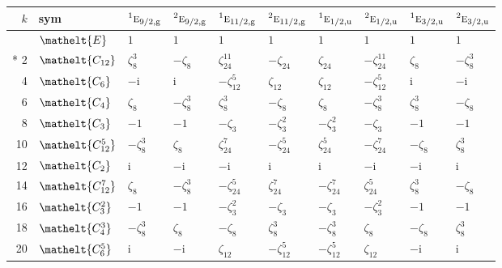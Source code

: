 \documentclass[10pt,a4paper]{article}
\numberwithin{equation}{section}
\newcommand{\eltfont}[1]{{\let\sigma\eltsigma\mathelt{#1}}}
\newcommand{\irr}[1]{\text{\normalfont\scshape #1}}
\newcommand{\conjpair}[1]{{}^{#1}}
\newcommand{\cls}[1]{\eltfont{#1}}
\newcommand{\ptag}[1]{\mathrm{#1}}
\newcommand{\iunit}{\mathrm{i}}
\newcommand{\rootunity}[1]{\zeta_{#1}}
\begin{document}
{\small\setlength{\tabcolsep}{4pt}
\begin{longtable}{@{}rlllllllll@{}}\toprule
$k$ & sym & $\conjpair{1}\irr{e}_{9/2,\ptag{g}}$ & $\conjpair{2}\irr{e}_{9/2,\ptag{g}}$ & $\conjpair{1}\irr{e}_{11/2,\ptag{g}}$ & $\conjpair{2}\irr{e}_{11/2,\ptag{g}}$ & $\conjpair{1}\irr{e}_{1/2,\ptag{u}}$ & $\conjpair{2}\irr{e}_{1/2,\ptag{u}}$ & $\conjpair{1}\irr{e}_{3/2,\ptag{u}}$ & $\conjpair{2}\irr{e}_{3/2,\ptag{u}}$\\\midrule\endhead
\bottomrule\endfoot\endlastfoot
0 & $\cls{E}$ & $1$ & $1$ & $1$ & $1$ & $1$ & $1$ & $1$ & $1$\\*
2 & $\cls{C_{12}}$ & $\rootunity{8}^{3}$ & $-\rootunity{8}$ & $\rootunity{24}^{11}$ & $-\rootunity{24}$ & $\rootunity{24}$ & $-\rootunity{24}^{11}$ & $\rootunity{8}$ & $-\rootunity{8}^{3}$\\
4 & $\cls{C_{6}}$ & $-\iunit{}$ & $\iunit{}$ & $-\rootunity{12}^{5}$ & $\rootunity{12}$ & $\rootunity{12}$ & $-\rootunity{12}^{5}$ & $\iunit{}$ & $-\iunit{}$\\
6 & $\cls{C_{4}}$ & $\rootunity{8}$ & $-\rootunity{8}^{3}$ & $\rootunity{8}^{3}$ & $-\rootunity{8}$ & $\rootunity{8}$ & $-\rootunity{8}^{3}$ & $\rootunity{8}^{3}$ & $-\rootunity{8}$\\
8 & $\cls{C_{3}}$ & $-1$ & $-1$ & $-\rootunity{3}$ & $-\rootunity{3}^{2}$ & $-\rootunity{3}^{2}$ & $-\rootunity{3}$ & $-1$ & $-1$\\
10 & $\cls{C_{12}^{5}}$ & $-\rootunity{8}^{3}$ & $\rootunity{8}$ & $\rootunity{24}^{7}$ & $-\rootunity{24}^{5}$ & $\rootunity{24}^{5}$ & $-\rootunity{24}^{7}$ & $-\rootunity{8}$ & $\rootunity{8}^{3}$\\
12 & $\cls{C_{2}}$ & $\iunit{}$ & $-\iunit{}$ & $-\iunit{}$ & $\iunit{}$ & $\iunit{}$ & $-\iunit{}$ & $-\iunit{}$ & $\iunit{}$\\
14 & $\cls{C_{12}^{7}}$ & $\rootunity{8}$ & $-\rootunity{8}^{3}$ & $-\rootunity{24}^{5}$ & $\rootunity{24}^{7}$ & $-\rootunity{24}^{7}$ & $\rootunity{24}^{5}$ & $\rootunity{8}^{3}$ & $-\rootunity{8}$\\
16 & $\cls{C_{3}^{2}}$ & $-1$ & $-1$ & $-\rootunity{3}^{2}$ & $-\rootunity{3}$ & $-\rootunity{3}$ & $-\rootunity{3}^{2}$ & $-1$ & $-1$\\
18 & $\cls{C_{4}^{3}}$ & $-\rootunity{8}^{3}$ & $\rootunity{8}$ & $-\rootunity{8}$ & $\rootunity{8}^{3}$ & $-\rootunity{8}^{3}$ & $\rootunity{8}$ & $-\rootunity{8}$ & $\rootunity{8}^{3}$\\
20 & $\cls{C_{6}^{5}}$ & $\iunit{}$ & $-\iunit{}$ & $\rootunity{12}$ & $-\rootunity{12}^{5}$ & $-\rootunity{12}^{5}$ & $\rootunity{12}$ & $-\iunit{}$ & $\iunit{}$\\

\end{longtable}}
\end{document}
